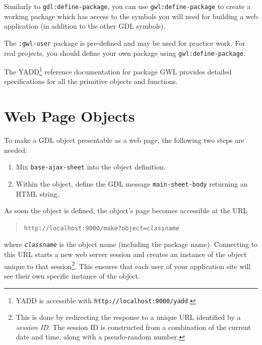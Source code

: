 \documentclass [11pt]{book}
\begin{document}
Similarly to \texttt{gdl:define-package}, you can use \texttt{gwl:define-package}
to create a working package which has access to the symbols you will need for building a
web application (in addition to the other GDL symbols).



The \texttt{:gwl-user} package is pre-defined and may be used for practice
work. For real projects, you should define your own package using \texttt{gwl:define-package}.



The YADD\footnote{YADD is accessible with \texttt{http://localhost:9000/yadd}.} reference documentation for package
GWL provides detailed specifications for all the primitive objects and functions.



\section{Web Page Objects}

\label{sec:webpageobjects}



To make a GDL object presentable as a web page, the following two
steps are needed:

\begin{enumerate}

\item Mix \texttt{base-ajax-sheet} into the object definition.

\item Within the object, define the GDL message \texttt{main-sheet-body} returning an HTML string.

\end{enumerate}





As soon the object is defined, the object's page becomes accessible at the URL

\begin{quote}
\texttt{http://localhost:9000/make?object=\emph{classname}}

\end{quote}
where \texttt{\emph{classname}} is the object name (including the package name).  Connecting to this
URL starts a new web server session and creates an instance of the object unique to that session\footnote{This is done by redirecting the response to a unique URL identified by a \emph{session ID}.
The session ID is constructed from a combination of the current date and time, along with a pseudo-random number.}.
This ensures that each user of your application site will see their own specific instance of the object.
\end{document}
